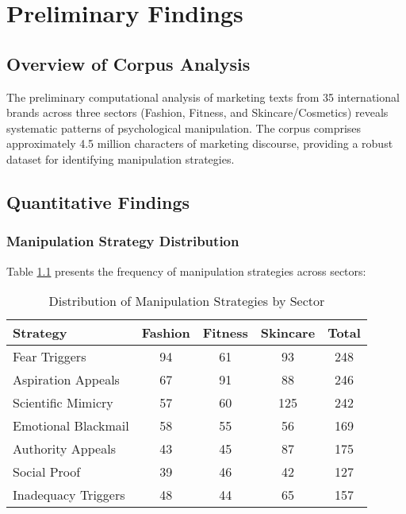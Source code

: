 
\chapter{Preliminary Findings}
\label{ch:preliminary}

\section{Overview of Corpus Analysis}

The preliminary computational analysis of marketing texts from 35 international brands across three sectors (Fashion, Fitness, and Skincare/Cosmetics) reveals systematic patterns of psychological manipulation. The corpus comprises approximately 4.5 million characters of marketing discourse, providing a robust dataset for identifying manipulation strategies.

\section{Quantitative Findings}

\subsection{Manipulation Strategy Distribution}

Table \ref{tab:manipulation_distribution} presents the frequency of manipulation strategies across sectors:

\begin{table}[h!]
\centering
\caption{Distribution of Manipulation Strategies by Sector}
\label{tab:manipulation_distribution}
\begin{tabular}{l|ccc|c}
\toprule
\textbf{Strategy} & \textbf{Fashion} & \textbf{Fitness} & \textbf{Skincare} & \textbf{Total} \\
\midrule
Fear Triggers & 94 & 61 & 93 & 248 \\
Aspiration Appeals & 67 & 91 & 88 & 246 \\
Scientific Mimicry & 57 & 60 & 125 & 242 \\
Emotional Blackmail & 58 & 55 & 56 & 169 \\
Authority Appeals & 43 & 45 & 87 & 175 \\
Social Proof & 39 & 46 & 42 & 127 \\
Inadequacy Triggers & 48 & 44 & 65 & 157 \\
\bottomrule
\end{tabular}
\end{table}


